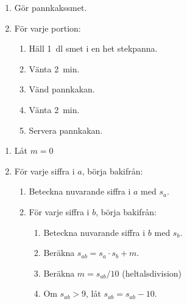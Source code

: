 \begin{frame}
  \begin{example}
    \begin{enumerate}
      \item Gör pannkakssmet.
      \item För varje portion:
        \begin{enumerate}
          \item Häll \SI{1}{\deci\litre} smet i en het stekpanna.
          \item Vänta \SI{2}{\minute}.
          \item Vänd pannkakan.
          \item Vänta \SI{2}{\minute}.
          \item Servera pannkakan.
        \end{enumerate}
    \end{enumerate}
  \end{example}
\end{frame}

\begin{frame}
  \begin{example}
    \begin{enumerate}
      \item Låt \(m = 0\)
      \item För varje siffra i \(a\), börja bakifrån:
        \begin{enumerate}
          \item Beteckna nuvarande siffra i \(a\) med \(s_a\).
          \item För varje siffra i \(b\), börja bakifrån:
            \begin{enumerate}
              \item Beteckna nuvarande siffra i \(b\) med \(s_b\).
              \item Beräkna \(s_{ab} = s_a\cdot s_b + m\).
              \item Beräkna \(m = s_{ab} / 10\) (heltalsdivision)
              \item Om \(s_{ab} > 9\), låt \(s_{ab} = s_{ab} - 10\).
            \end{enumerate}
        \end{enumerate}
    \end{enumerate}
  \end{example}
\end{frame}

